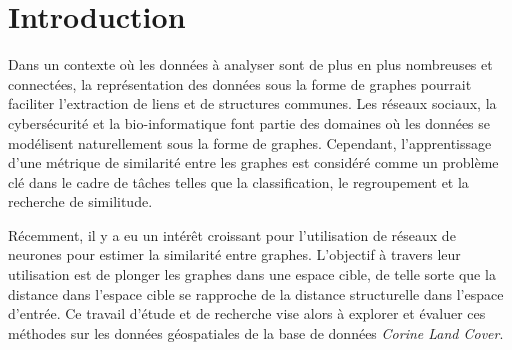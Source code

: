 \chapter*{Introduction}

Dans un contexte où les données à analyser sont de plus en plus nombreuses et connectées, la représentation des données
sous la forme de graphes pourrait faciliter l'extraction de liens et de structures communes.
Les réseaux sociaux, la cybersécurité et la bio-informatique font partie des domaines où les données se
modélisent naturellement sous la forme de graphes.
Cependant, l'apprentissage d'une métrique de similarité entre les graphes est considéré comme un problème clé dans le
cadre de tâches telles que la classification, le regroupement et la recherche de similitude.

Récemment, il y a eu un intérêt croissant pour l'utilisation de réseaux de neurones pour estimer la similarité entre
graphes.
L'objectif à travers leur utilisation est de plonger les graphes dans une espace cible, de telle sorte que la distance
dans l'espace cible se rapproche de la distance structurelle dans l'espace d'entrée.
Ce travail d'étude et de recherche vise alors à explorer et évaluer ces méthodes sur les données géospatiales de la base
de données \emph{Corine Land Cover}.


